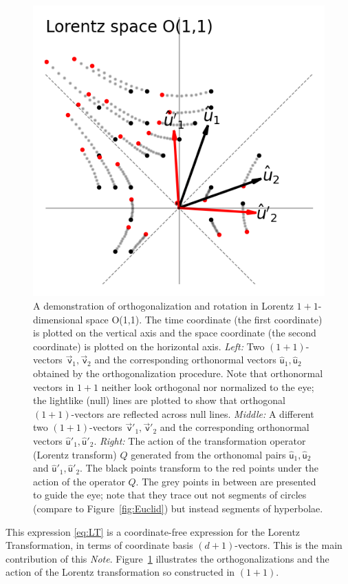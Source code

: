 \documentclass{article}
\newcommand\upvec[1]{\!\vec{\,\mathrm{#1}}}
\newcommand{\Lvec}[1]{\upvec{\mathsf{#1}}} %
\newcommand{\Lhat}[1]{\hat{\mathsf{#1}}} %
\newcommand{\plus}{\!+\!} %
\newcommand{\documentname}{\textsl{Note}}
\newcommand{\figref}[1]{Figure~\ref{#1}}
\newlength{\figurewidth}
\begin{document}
\begin{figure}[t]
\begin{mdframed}
\includegraphics[width=\figurewidth]{L_Q.png}
\caption{A demonstration of orthogonalization and rotation in Lorentz $1\plus1$-dimensional space O(1,1).
The time coordinate (the first coordinate) is plotted on the vertical axis and the space coordinate (the second coordinate) is plotted on the horizontal axis.
\textsl{Left:} Two $(1\plus1)$-vectors $\Lvec{v}_1, \Lvec{v}_2$ and the corresponding orthonormal vectors $\Lhat{u}_1, \Lhat{u}_2$ obtained by the orthogonalization procedure.
Note that orthonormal vectors in $1\plus1$ neither look orthogonal nor normalized to the eye; the lightlike (null) lines are plotted to show that orthogonal $(1\plus1)$-vectors are reflected across null lines.
\textsl{Middle:} A different two $(1\plus1)$-vectors $\Lvec{v}'_1, \Lvec{v}'_2$ and the corresponding orthonormal vectors $\Lhat{u}'_1, \Lhat{u}'_2$.
\textsl{Right:} The action of the transformation operator (Lorentz transform) $Q$ generated from the orthonomal pairs $\Lhat{u}_1, \Lhat{u}_2$ and $\Lhat{u}'_1, \Lhat{u}'_2$.
The black points transform to the red points under the action of the operator $Q$.
The grey points in between are presented to guide the eye; 
note that they trace out not segments of circles (compare to \figref{fig:Euclid}) but instead segments of hyperbolae.\label{fig:Lorentz}}
\end{mdframed}
\end{figure}
This expression \eqref{eq:LT} is a coordinate-free expression for the Lorentz Transformation, in terms of coordinate basis $(d\plus1)$-vectors.
This is the main contribution of this \documentname.
\figref{fig:Lorentz} illustrates the orthogonalizations and the action of the Lorentz transformation so constructed in $(1\plus1)$.
\end{document}
